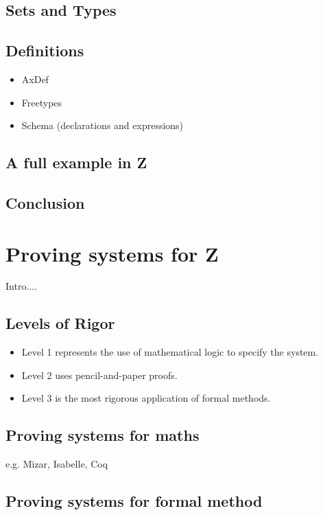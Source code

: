 \subsection{Sets and Types}

\subsection{Definitions}

\begin{itemize}
\item AxDef
\item Freetypes
\item Schema (declarations and expressions)
\end{itemize}

\subsection{A full example in Z}


\subsection{Conclusion}

\section{Proving systems for Z}

Intro....

\subsection{Levels of Rigor}

\begin{itemize}
\item Level 1 represents the use of mathematical logic to specify the system.
\item Level 2 uses pencil-and-paper proofs.
\item Level 3 is the most rigorous application of formal methods.

\end{itemize}

\subsection{Proving systems for maths}

e.g. Mizar, Isabelle, Coq

\subsection{Proving systems for formal method}

